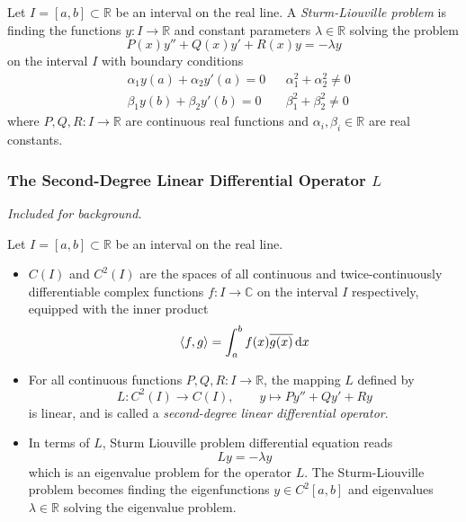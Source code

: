\documentclass[11pt, a4paper]{article}
\newcommand{\question}[1]{\textit{#1}\vspace{2mm}}
\newcommand{\R}{\mathbb{R}} %
\newcommand{\C}{\mathbb{C}} %
\newcommand{\diff}{\mathop{}\!\mathrm{d}} %
\begin{document}
Let $ I = [a, b] \subset \R $ be an interval on the real line. A \textit{Sturm-Liouville problem} is finding the functions $ y : I \to \R $ and constant parameters $ \lambda \in \R $ solving the problem
\begin{equation*}
	P(x) y'' + Q(x)y' + R(x) y = - \lambda y
\end{equation*}
on the interval $ I $ with boundary conditions
\begin{align*}
	&\alpha_1 y(a) + \alpha_2 y'(a) = 0 && \alpha_1^2 + \alpha_2^2 \neq 0\\
	&\beta_1y(b) + \beta_2 y'(b) = 0 &&  \beta_1^2 + \beta_2^2 \neq 0
\end{align*}
where $ P, Q, R : I \to \R $ are continuous real functions and $ \alpha_i, \beta_i \in \R$ are real constants.




\subsubsection{The Second-Degree Linear Differential Operator $ L $}
\question{Included for background.}

Let $ I = [a, b] \subset \R $ be an interval on the real line.
\begin{itemize}
	\item $ C(I) $ and $ C^{2}(I) $ are the spaces of all continuous and twice-continuously differentiable complex functions $ f : I \to \C $ on the interval $ I $ respectively, equipped with the inner product
	\begin{equation*}
		\expval{f, g} = \int_{a}^{b} f(x) \overline{g(x)} \diff x
	\end{equation*}
	
	\item For all continuous functions $ P, Q, R:I \to \R $, the mapping $ L $ defined by
	\begin{equation*}
		L : C^2(I) \to C(I), \qquad y \mapsto Py'' + Qy' + Ry 
	\end{equation*}
	is linear, and is called a \textit{second-degree linear differential operator}. 
	
	\item In terms of $ L $, Sturm Liouville problem differential equation reads
	\begin{equation*}
		Ly = -\lambda y
	\end{equation*}
	which is an eigenvalue problem for the operator $ L $. The Sturm-Liouville problem becomes finding the eigenfunctions $ y \in C^2[a, b] $ and eigenvalues $ \lambda \in \R $ solving the eigenvalue problem.
\end{itemize}
\end{document}
